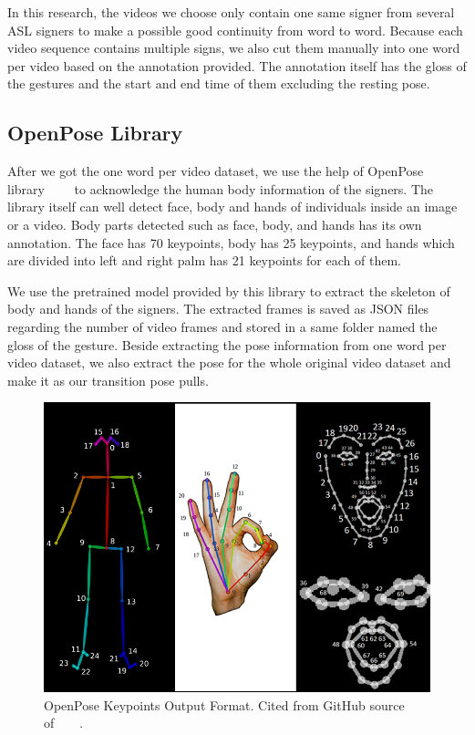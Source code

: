 \documentclass{sig-alternate-05-2015}
\begin{document}
In this research, the videos we choose only contain one same signer from several ASL signers to make a possible good continuity from word to word. Because each video sequence contains multiple signs, we also cut them manually into one word per video based on the annotation provided. The annotation itself has the gloss of  the gestures and the start and end time of them excluding the resting pose.

\subsection{OpenPose Library}
After we got the one word per video dataset, we use the help of OpenPose library~\cite{openpose1}~\cite{openpose2}~\cite{openpose3}~\cite{openpose4} to acknowledge the human body information of the signers. The library itself can well detect face, body and hands of individuals inside an image or a video. Body parts detected such as face, body, and hands has its own annotation. The face has 70 keypoints, body has 25 keypoints, and hands which are divided into left and right palm has 21 keypoints for each of them.

We use the pretrained model provided by this library to extract the skeleton of body and hands of the signers. The extracted frames is saved as JSON files regarding the number of video frames and stored in a same folder named the gloss of the gesture. Beside extracting the pose information from one word per video dataset, we also extract the pose for the whole original video dataset and make it as our transition pose pulls. 

\begin{figure}
	\centering
	\includegraphics[width=\linewidth]{img/openpose.png}
	\caption{OpenPose Keypoints Output Format. Cited from GitHub source of~\cite{openpose1}~\cite{openpose2}~\cite{openpose3}~\cite{openpose4}.}
\end{figure}
\end{document}

